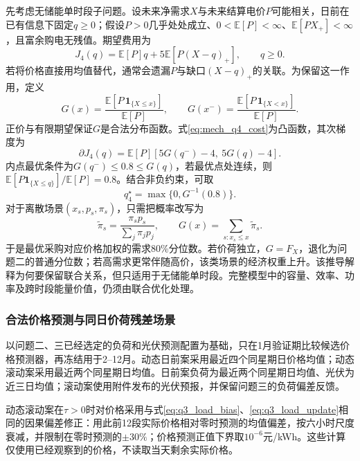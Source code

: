 先考虑无储能单时段子问题。设未来净需求$X$与未来结算电价$P$可能相关，日前在已有信息下固定$q\ge0$；假设$P>0$几乎处处成立、$0<\mathbb E[P]<\infty$、$\mathbb E[PX_+]<\infty$，且富余购电无残值。期望费用为
\begin{equation}
 J_4(q)=\mathbb E[P]q+5\mathbb E[P(X-q)_+],\qquad q\ge0.
 \label{eq:mech_q4_cost}
\end{equation}
若将价格直接用均值替代，通常会遗漏$P$与缺口$(X-q)_+$的关联。为保留这一作用，定义
\begin{equation}
 G(x)=\frac{\mathbb E[P\,\mathbf 1_{\{X\le x\}}]}{\mathbb E[P]},\qquad
 G(x^-)=\frac{\mathbb E[P\,\mathbf 1_{\{X<x\}}]}{\mathbb E[P]}.
 \label{eq:mech_weighted_cdf}
\end{equation}
正价与有限期望保证$G$是合法分布函数。式\eqref{eq:mech_q4_cost}为凸函数，其次梯度为
\begin{equation}
 \partial J_4(q)=\mathbb E[P][5G(q^-)-4,\ 5G(q)-4].
 \label{eq:mech_q4_subgradient}
\end{equation}
内点最优条件为$G(q^-)\le0.8\le G(q)$，若最优点处连续，则
$\mathbb E[P\mathbf 1_{\{X\le q\}}]/\mathbb E[P]=0.8$。结合非负约束，可取
\begin{equation}
 q_4^\star=\max\{0,G^{-1}(0.8)\}.
 \label{eq:mech_weighted_quantile}
\end{equation}
对于离散场景$(x_s,p_s,\pi_s)$，只需把概率改写为
\begin{equation}
 \widetilde\pi_s=\frac{\pi_sp_s}{\sum_j\pi_jp_j},\qquad
 G(x)=\sum_{s:x_s\le x}\widetilde\pi_s.
 \label{eq:mech_scenario_reweight}
\end{equation}
于是最优采购对应价格加权的需求80\%分位数。若价荷独立，$G=F_X$，退化为问题二的普通分位数；若高需求更常伴随高价，该类场景的经济权重上升。该推导解释为何要保留联合关系，但只适用于无储能单时段。完整模型中的容量、效率、功率及跨时段能量价值，仍须由联合优化处理。

\subsubsection{合法价格预测与同日价荷残差场景}

以问题二、三已经选定的负荷和光伏预测配置为基础，只在1月验证期比较候选价格预测器，再冻结用于2--12月。动态日前案采用最近四个同星期日价格均值；动态滚动案采用最近两个同星期日均值。日前案负荷为最近两个同星期日均值、光伏为近三日均值；滚动案使用附件发布的光伏预报，并保留问题三的负荷偏差反馈。

动态滚动案在$\tau>0$时对价格采用与式\eqref{eq:q3_load_bias}、\eqref{eq:q3_load_update}相同的因果偏差修正：用此前12段实际价格相对零时预测的均值偏差，按六小时尺度衰减，并限制在零时预测的$\pm30\%$；价格预测正值下界取$10^{-6}$元/kWh。这些计算仅使用已经观察到的价格，不读取当天剩余实际价格。

